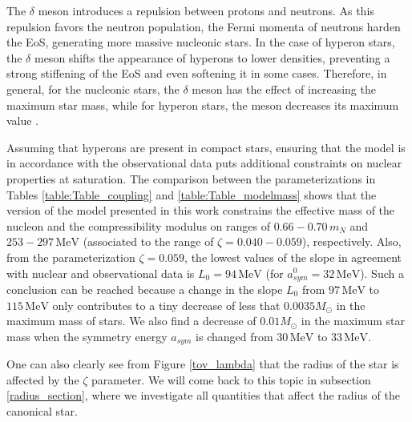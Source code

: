 \documentclass[twocolumn,showpacs,aps]{revtex4}
\begin{document}
The $\delta$ meson introduces a repulsion between protons and neutrons.
As this repulsion favors the neutron population, the Fermi momenta of neutrons harden the
EoS, generating more massive nucleonic stars.
In the case of hyperon stars, the $\delta$ meson shifts the appearance of hyperons to lower densities,
preventing a strong stiffening of the EoS and even softening it in some cases.
Therefore, in general, for the nucleonic stars, the $\delta$ meson has the effect of increasing the maximum star mass,
while for hyperon stars, the meson decreases its maximum value \cite{Menezes:2004vr}.


Assuming that hyperons are present in compact stars, ensuring that the model is in accordance with
the observational data puts additional constraints on nuclear properties at saturation.
The comparison between the parameterizations in Tables \ref{table:Table_coupling} and \ref{table:Table_modelmass}
shows that the version of the model presented in this work constrains the effective mass of the nucleon and the compressibility modulus 
on ranges of $0.66-0.70\,m_N$ and $253-297\, \mathrm{MeV}$
  (associated to the range of $\zeta=0.040-0.059$), respectively. 
Also, from the parameterization $\zeta=0.059$, the lowest values of the slope in agreement with nuclear and
observational data is $L_0=94\,\mathrm{MeV}$ (for $a_{sym}^0=32\,\mathrm{MeV}$).
Such a conclusion can be reached because a change in the slope $L_0$ from $97\,\mathrm{MeV}$ to $115\,\mathrm{MeV}$ only contributes to
a tiny decrease of less that $0.0035M_{\odot}$ in the maximum mass of stars.
We also find a decrease of $0.01M_{\odot}$ in the maximum star mass when the symmetry energy $a_{sym}$ is changed from $30\,\mathrm{MeV}$ to $33\,\mathrm{MeV}$.


One can also clearly see from Figure \ref{tov_lambda} that the radius of the star is affected by the $\zeta$ parameter.
We will come back to this topic in subsection \ref{radius_section}, where we investigate all quantities that affect the 
radius of the canonical star.
\end{document}
